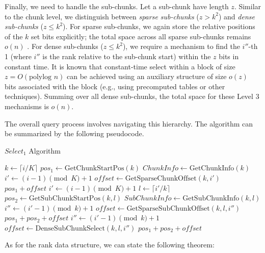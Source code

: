 Finally, we need to handle the sub-chunks. Let a sub-chunk have length $z$. Similar to the chunk level, we distinguish between \emph{sparse sub-chunks} ($z > k^2$) and \emph{dense sub-chunks} ($z \le k^2$). For sparse sub-chunks, we again store the relative positions of the $k$ set bits explicitly; the total space across all sparse sub-chunks remains $o(n)$ \cite{clark1997compact}. For dense sub-chunks ($z \le k^2$), we require a mechanism to find the $i''$-th 1 (where $i''$ is the rank relative to the sub-chunk start) within the $z$ bits in constant time. It is known \cite{clark1997compact} that constant-time \textsf{select} within a block of size $z=O(\text{polylog } n)$ can be achieved using an auxiliary structure of size $o(z)$ bits associated with the block (e.g., using precomputed tables or other techniques). Summing over all dense sub-chunks, the total space for these Level 3 mechanisms is $o(n)$.

The overall query process involves navigating this hierarchy. The algorithm can be summarized by the following pseudocode.

\begin{algorithm}[hbtp]
    \caption{$Select_1$ Algorithm} \label{alg:select}
    \begin{algorithmic}[1] \small
        \State $k \gets \lceil i/K \rceil$
        \State $pos_1 \gets \text{GetChunkStartPos}(k)$
        \State $ChunkInfo \gets \text{GetChunkInfo}(k)$
        \State $i' \gets (i-1) \pmod K + 1$
        \State $offset \gets \text{GetSparseChunkOffset}(k, i')$
        \State \Return $pos_1 + offset$
        \Else
        \State $i' \gets (i-1) \pmod K + 1$
        \State $l \gets \lceil i'/k \rceil$
        \State $pos_2 \gets \text{GetSubChunkStartPos}(k, l)$
        \State $SubChunkInfo \gets \text{GetSubChunkInfo}(k, l)$
        \State $i'' \gets (i'-1) \pmod k + 1$
        \State $offset \gets \text{GetSparseSubChunkOffset}(k, l, i'')$
        \State \Return $pos_1 + pos_2 + offset$
        \Else
        \State $i'' \gets (i'-1) \pmod k + 1$
        \State $offset \gets \text{DenseSubChunkSelect}(k, l, i'')$
        \State \Return $pos_1 + pos_2 + offset$
        \EndIf
        \EndIf
        \EndFunction
    \end{algorithmic}
\end{algorithm}

As for the rank data structure, we can state the following theorem:

